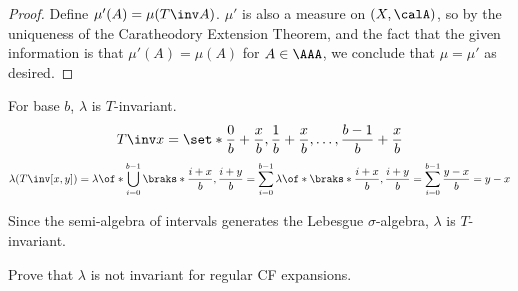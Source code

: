 \documentclass{article}
\begin{document}
\begin{proof}
    Define $\mu'(A) = \mu(T\inv A)$. $\mu'$ is also a measure
    on $(X,\calA)$, so by the uniqueness of the Caratheodory
    Extension Theorem, and the fact that the given information
    is that $\mu'(A)=\mu(A)$ for $A\in\AAA$, we conclude 
    that $\mu=\mu'$ as desired.
\end{proof}

\begin{example}
    For base $b$, $\lambda$ is $T$-invariant.
    \[ T\inv x = \set*{\frac{0}{b} + \frac{x}{b},
    \frac{1}{b} + \frac{x}{b}, \ldots, 
    \frac{b-1}{b} + \frac{x}{b}}\]
    \[ \lambda(T\inv [x,y]) = 
    \lambda \of*{\bigcup_{i=0}^{b-1} \braks*{\frac{i+x}{b}, \frac{i+y}{b}}
    }
    = \sum_{i=0}^{b-1} \lambda\of*{\braks*{\frac{i+x}{b},\frac{i+y}{b}}}
    = \sum_{i=0}^{b-1} \frac{y-x}{b} = y-x
    \]

    Since the semi-algebra of intervals generates the 
    Lebesgue $\sigma$-algebra, $\lambda$ is $T$-invariant.
\end{example}

\begin{exercise}
    Prove that $\lambda$ is not invariant for regular
    CF expansions.
\end{exercise}
\end{document}
